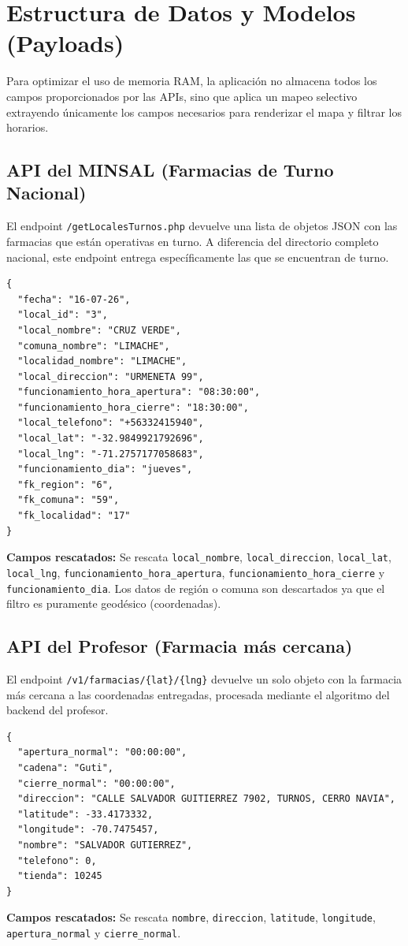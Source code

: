 \documentclass[12pt,a4paper]{article}
\begin{document}
\section{Estructura de Datos y Modelos (Payloads)}
Para optimizar el uso de memoria RAM, la aplicación no almacena todos los campos proporcionados por las APIs, sino que aplica un mapeo selectivo extrayendo únicamente los campos necesarios para renderizar el mapa y filtrar los horarios.

\subsection{API del MINSAL (Farmacias de Turno Nacional)}
El endpoint \texttt{/getLocalesTurnos.php} devuelve una lista de objetos JSON con las farmacias que están operativas en turno. A diferencia del directorio completo nacional, este endpoint entrega específicamente las que se encuentran de turno.
\begin{verbatim}
{
  "fecha": "16-07-26",
  "local_id": "3",
  "local_nombre": "CRUZ VERDE",
  "comuna_nombre": "LIMACHE",
  "localidad_nombre": "LIMACHE",
  "local_direccion": "URMENETA 99",
  "funcionamiento_hora_apertura": "08:30:00",
  "funcionamiento_hora_cierre": "18:30:00",
  "local_telefono": "+56332415940",
  "local_lat": "-32.9849921792696",
  "local_lng": "-71.2757177058683",
  "funcionamiento_dia": "jueves",
  "fk_region": "6",
  "fk_comuna": "59",
  "fk_localidad": "17"
}
\end{verbatim}
\textbf{Campos rescatados:} Se rescata \texttt{local\_nombre}, \texttt{local\_direccion}, \texttt{local\_lat}, \texttt{local\_lng}, \texttt{funcionamiento\_\allowbreak hora\_\allowbreak apertura}, \texttt{funcionamiento\_\allowbreak hora\_\allowbreak cierre} y \texttt{funcionamiento\_\allowbreak dia}. Los datos de región o comuna son descartados ya que el filtro es puramente geodésico (coordenadas).

\subsection{API del Profesor (Farmacia más cercana)}
El endpoint \texttt{/v1/farmacias/\{lat\}/\{lng\}} devuelve un solo objeto con la farmacia más cercana a las coordenadas entregadas, procesada mediante el algoritmo del backend del profesor.

\begin{verbatim}
{
  "apertura_normal": "00:00:00",
  "cadena": "Guti",
  "cierre_normal": "00:00:00",
  "direccion": "CALLE SALVADOR GUITIERREZ 7902, TURNOS, CERRO NAVIA",
  "latitude": -33.4173332,
  "longitude": -70.7475457,
  "nombre": "SALVADOR GUTIERREZ",
  "telefono": 0,
  "tienda": 10245
}
\end{verbatim}
\textbf{Campos rescatados:} Se rescata \texttt{nombre}, \texttt{direccion}, \texttt{latitude}, \texttt{longitude}, \texttt{apertura\_normal} y \texttt{cierre\_normal}.
\end{document}
